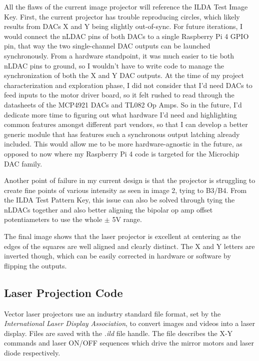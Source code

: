 \documentclass[journal]{IEEEtran}
\begin{document}
    All the flaws of the current image projector will reference the ILDA Test Image Key.
    First, the current projector has trouble reproducing circles, which likely results from DACs X and Y being slightly out-of-sync.
    For future iterations, I would connect the nLDAC pins of both DACs to a single Raspberry Pi 4 GPIO pin, that way the two single-channel DAC outputs can be launched synchronously.
    From a hardware standpoint, it was much easier to tie both nLDAC pins to ground, so I wouldn't have to write code to manage the synchronization of both the X and Y DAC outputs.
    At the time of my project characterization and exploration phase, I did not consider that I'd need DACs to feed inputs to the motor driver board, so it felt rushed to read through the datasheets of the MCP4921 DACs and TL082 Op Amps.
    So in the future, I'd dedicate more time to figuring out what hardware I'd need and highlighting common features amongst different part vendors, so that I can develop a better generic module that has features such a synchronous output latching already included.
    This would allow me to be more hardware-agnostic in the future, as opposed to now where my Raspberry Pi 4 code is targeted for the Microchip DAC family.
    
    Another point of failure in my current design is that the projector is struggling to create fine points of various intensity as seen in image 2, tying to B3/B4.
    From the ILDA Test Pattern Key, this issue can also be solved through tying the nLDACs together and also better aligning the bipolar op amp offset potentiameters to use the whole $\pm$ 5V range. 

    The final image shows that the laser projector is excellent at centering as the edges of the squares are well aligned and clearly distinct.
    The X and Y letters are inverted though, which can be easily corrected in hardware or software by flipping the outputs.

    \subsection{Laser Projection Code}
    
    Vector laser projectors use an industry standard file format, set by the \emph{International Laser Display Association}, to convert images and videos into a laser display.
    Files are saved with the \emph{.ild} file handle.
    The file describes the X-Y commands and laser ON/OFF sequences which drive the mirror motors and laser diode respectively.
\end{document}
